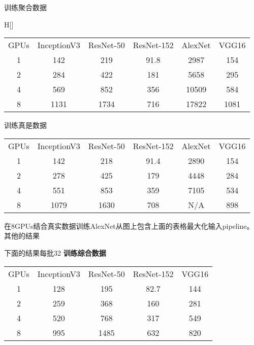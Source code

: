 训练聚合数据
\begin{table}H[]
	\begin{tabular}{|c|c|c|c|c|c|}
		GPUs	&InceptionV3	&ResNet-50	&ResNet-152	&AlexNet	&VGG16\\
		1	&142	&219	&91.8	&2987	&154\\
		2	&284	&422	&181	&5658	&295\\
		4	&569	&852	&356	&10509	&584\\
		8	&1131	&1734	&716	&17822	&1081\\
	\end{tabular}
\end{table}
训练真是数据
\begin{table}[H]
	\begin{tabular}{|c|c|c|c|c|c|}
		GPUs	&InceptionV3	&ResNet-50	&ResNet-152	&AlexNet	&VGG16\\
		1	&142	&218	&91.4	&2890	&154\\
		2	&278	&425	&179	&4448	&284\\
		4	&551	&853	&359	&7105	&534\\
		8	&1079	&1630	&708	&N/A	&898\\
	\end{tabular}
\end{table}
在8GPUs结合真实数据训练AlexNet从图上包含上面的表格最大化输入pipeline。
其他的结果

下面的结果每批32
\textbf{训练综合数据}
\begin{table}[H]
	\begin{tabular}{|c|c|c|c|c|}
		GPUs	&InceptionV3	&ResNet-50	&ResNet-152	&VGG16\\
		1	&128	&195	&82.7	&144\\
		2	&259	&368	&160	&281\\
		4	&520	&768	&317	&549\\
		8	&995	&1485	&632	&820\\
	\end{tabular}
\end{table}

